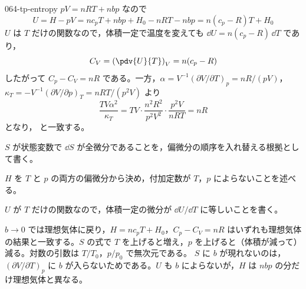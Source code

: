 \documentclass[uplatex,dvipdfmx,a4paper,11pt]{jsarticle}
\begin{document}
\begin{kaisetsu}{064-tp-entropy}
 $pV = nRT + nbp$ なので
\[ U = H - pV = nc_{p}T + nbp + H_{0} - nRT - nbp = n(c_{p} - R)T + H_{0} \]
$U$ は $T$ だけの関数なので，体積一定で温度を変えても $\dd U = n(c_{p} - R)\,\dd T$ であり，
\[ C_{V} = \left(\pdv{U}{T}\right)_{V} = n(c_{p} - R) \]
したがって $C_{p} - C_{V} = nR$ である。一方，$\alpha = V^{-1}(\partial V/\partial T)_{p} = nR/(pV)$，$\kappa_{T} = -V^{-1}(\partial V/\partial p)_{T} = nRT/(p^{2}V)$ より
\[ \frac{TV\alpha^{2}}{\kappa_{T}} = TV \cdot \frac{n^{2}R^{2}}{p^{2}V^{2}} \cdot \frac{p^{2}V}{nRT} = nR \]
となり， と一致する。
\begin{ronten}
  \item {} $S$ が状態変数で $\dd S$ が全微分であることを，偏微分の順序を入れ替える根拠として書く。
  \item {} $H$ を $T$ と $p$ の両方の偏微分から決め，付加定数が $T$，$p$ によらないことを述べる。
  \item {} $U$ が $T$ だけの関数なので，体積一定の微分が $\dd U/\dd T$ に等しいことを書く。
\end{ronten}
\kenzan $b \to 0$ では理想気体に戻り，$H = nc_{p}T + H_{0}$，$C_{p} - C_{V} = nR$ はいずれも理想気体の結果と一致する。$S$ の式で $T$ を上げると増え，$p$ を上げると（体積が減って）減る。対数の引数は $T/T_{0}$，$p/p_{0}$ で無次元である。
\tsumazuki $S$ に $b$ が現れないのは，$(\partial V/\partial T)_{p}$ に $b$ が入らないためである。$U$ も $b$ によらないが，$H$ は $nbp$ の分だけ理想気体と異なる。
\end{kaisetsu}
\end{document}
